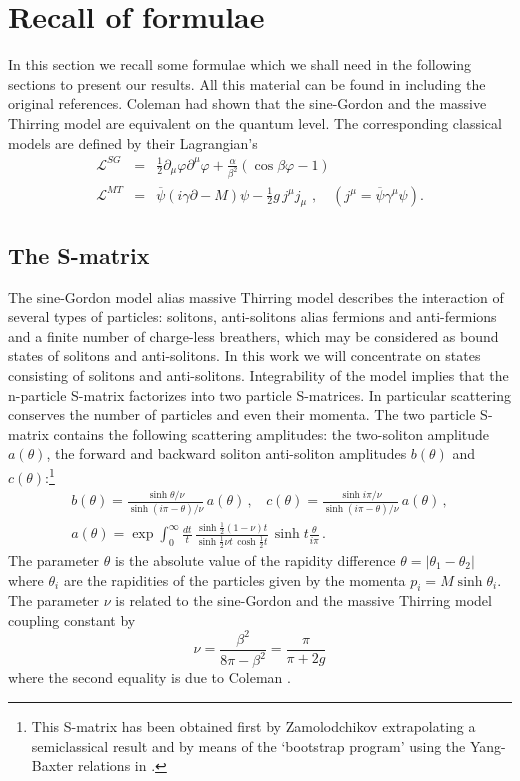 \documentclass[a4paper,a4paper]{article}
\begin{document}
\section{Recall of formulae}

\label{s2}

In this section we recall some formulae which we shall need in the following
sections to present our results. All this material can be found in \cite
{BFKZ} including the original references. Coleman \cite{Co} had shown that
the sine-Gordon and the massive Thirring model are equivalent on the quantum
level. The corresponding classical models are defined by their Lagrangian's 
\begin{eqnarray}
\mathcal{L}^{SG} &=&\tfrac{1}{2}\partial _{\mu }\varphi \partial ^{\mu
}\varphi +\frac{\alpha }{\beta ^{2}}\left( \cos \beta \varphi -1\right) 
\nonumber \\
\mathcal{L}^{MT} &=&\overline{\psi }(i\gamma \partial -M)\psi -\tfrac{1}{2}%
g\,j^{\mu }j_{\mu }\,\,,\quad \left( j^{\mu }=\overline{\psi }\gamma ^{\mu
}\psi \right) .  \label{0.2}
\end{eqnarray}

\subsection{The S-matrix}

The sine-Gordon model alias massive Thirring model describes the interaction
of several types of particles: solitons, anti-solitons alias fermions and
anti-fermions and a finite number of charge-less breathers, which may be
considered as bound states of solitons and anti-solitons. In this work we
will concentrate on states consisting of solitons and anti-solitons.
Integrability of the model implies that the n-particle S-matrix factorizes
into two particle S-matrices. In particular scattering conserves the number
of particles and even their momenta. The two particle S-matrix contains the
following scattering amplitudes: the two-soliton amplitude $a(\theta )$, the
forward and backward soliton anti-soliton amplitudes $b(\theta )$ and $%
c(\theta )$:\footnote{%
This S-matrix has been obtained first by Zamolodchikov \cite{Za}
extrapolating a semiclassical result and by means of the `bootstrap program'
using the Yang-Baxter relations in \cite{KTTW}.} 
\begin{gather}
b(\theta )=\frac{\sinh \theta /\nu }{\sinh (i\pi -\theta )/\nu }\,a(\theta
)\,,~~~~c(\theta )=\frac{\sinh i\pi /\nu }{\sinh (i\pi -\theta )/\nu }%
\,a(\theta )\,,  \nonumber \\
a(\theta )=\exp \int_{0}^{\infty }\frac{dt}{t}\,\frac{\sinh \frac{1}{2}%
(1-\nu )t}{\sinh \frac{1}{2}\nu t\,\cosh \frac{1}{2}t}\,\sinh t\frac{\theta 
}{i\pi }\,.  \label{s}
\end{gather}
The parameter $\theta $ is the absolute value of the rapidity difference $%
\theta =|\theta _{1}-\theta _{2}|$ where $\theta _{i}$ are the rapidities of
the particles given by the momenta $p_{i}=M\sinh \theta _{i}$. The parameter 
$\nu $ is related to the sine-Gordon and the massive Thirring model coupling
constant by 
\[
\nu =\frac{\beta ^{2}}{8\pi -\beta ^{2}}=\frac{\pi }{\pi +2g} 
\]
where the second equality is due to Coleman \cite{Co}.
\end{document}
